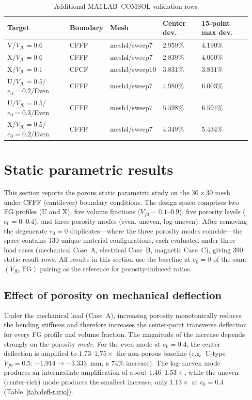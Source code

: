 \documentclass[11pt,a4paper]{article}
\begin{document}
\begin{table}[H]
\centering
\caption{Additional MATLAB--COMSOL validation rows}
\label{tab:validation-extra}
\begin{tabular}{p{36mm}p{20mm}p{30mm}p{20mm}p{25mm}}
\toprule
\textbf{Target} & \textbf{Boundary} & \textbf{Mesh} & \textbf{Center dev.} & \textbf{15-point max dev.} \\
\midrule
V/$V_{f0}=0.6$ & CFFF & mesh4/sweep7 & $2.959\%$ & $4.190\%$ \\
X/$V_{f0}=0.6$ & CFFF & mesh4/sweep7 & $2.839\%$ & $4.060\%$ \\
X/$V_{f0}=0.1$ & CFCF & mesh3/sweep10 & $3.831\%$ & $3.831\%$ \\
U/$V_{f0}=0.5$/$e_0=0.2$/Even & CFFF & mesh4/sweep7 & $4.980\%$ & $6.003\%$ \\
U/$V_{f0}=0.5$/$e_0=0.3$/Even & CFFF & mesh4/sweep7 & $5.598\%$ & $6.594\%$ \\
X/$V_{f0}=0.5$/$e_0=0.2$/Even & CFFF & mesh4/sweep7 & $4.349\%$ & $5.434\%$ \\
\bottomrule
\end{tabular}
\end{table}

\section{Static parametric results}

This section reports the porous static parametric study on the $30\times30$ mesh under CFFF (cantilever) boundary conditions. The design space comprises two FG profiles (U and X), five volume fractions ($V_{f0} = 0.1$--$0.9$), five porosity levels ($e_0 = 0$--$0.4$), and three porosity modes (even, uneven, log-uneven). After removing the degenerate $e_0=0$ duplicates---where the three porosity modes coincide---the space contains 130 unique material configurations, each evaluated under three load cases (mechanical Case~A, electrical Case~B, magnetic Case~C), giving 390 static result rows. All results in this section use the baseline at $e_0=0$ of the same $(V_{f0}, \text{FG})$ pairing as the reference for porosity-induced ratios.

\subsection{Effect of porosity on mechanical deflection}

Under the mechanical load (Case~A), increasing porosity monotonically reduces the bending stiffness and therefore increases the center-point transverse deflection for every FG profile and volume fraction. The magnitude of the increase depends strongly on the porosity \emph{mode}. For the even mode at $e_0 = 0.4$, the center deflection is amplified to $1.73$--$1.75\times$ the non-porous baseline (e.g.\ U-type $V_{f0}=0.5$: $-1.914 \to -3.333$~mm, a $74\%$ increase). The log-uneven mode produces an intermediate amplification of about $1.46$--$1.53\times$, while the uneven (center-rich) mode produces the smallest increase, only $1.13\times$ at $e_0 = 0.4$ (Table~\ref{tab:defl-ratio}).
\end{document}
